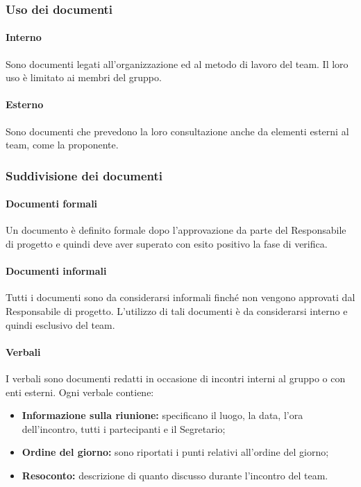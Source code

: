 \documentclass[11pt,a4paper]{article}
\begin{document}
{	\subsubsection{Uso dei documenti}
	\paragraph{Interno}
	Sono documenti legati all'organizzazione ed al metodo di lavoro del team. Il loro uso è limitato ai membri del gruppo.
	\paragraph{Esterno}
	Sono documenti che prevedono la loro consultazione anche da elementi esterni al team, come la proponente.
	\subsubsection{Suddivisione dei documenti}
	\paragraph{Documenti formali\\}
	Un documento è definito formale dopo l’approvazione da parte del Responsabile di progetto e quindi deve aver superato con esito positivo la fase di verifica.
	
	\paragraph{Documenti informali\\}
	Tutti i documenti sono da considerarsi informali finché non vengono approvati dal Responsabile di progetto. L’utilizzo di tali documenti è da considerarsi interno e quindi esclusivo del team.
	
	\paragraph{Verbali\\}
	I verbali sono documenti redatti in occasione di incontri interni al gruppo o con enti esterni. Ogni verbale contiene:
	
	\begin{itemize}
		\item \textbf{Informazione sulla riunione:} specificano il luogo, la data, l'ora dell’incontro, tutti i partecipanti e il Segretario;
		\item \textbf{Ordine del giorno:} sono riportati i punti relativi all’ordine del giorno;
		\item \textbf{Resoconto:} descrizione di quanto discusso durante l'incontro del team.
	\end{itemize}
	
}
\end{document}
